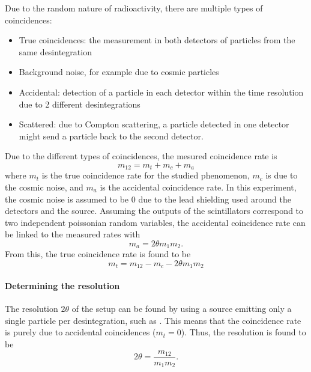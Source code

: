 Due to the random nature of radioactivity, there are multiple types of coincidences:
\begin{itemize}
    \item True coincidences: the measurement in both detectors of particles from the same desintegration
    \item Background noise, for example due to cosmic particles
    \item Accidental: detection of a particle in each detector within the time resolution due to 2 different desintegrations
    \item Scattered: due to Compton scattering, a particle detected in one detector might send a particle back to the second detector.
\end{itemize}

Due to the different types of coincidences, the mesured coincidence rate is
\begin{equation}
    m_{12} = m_t + m_c + m_a
\end{equation}
where \(m_t\) is the true coincidence rate for the studied phenomenon, \(m_c\) is due to the cosmic noise, and \(m_a\) is the accidental coincidence rate. In this experiment, the cosmic noise is assumed to be \(0\) due to the lead shielding used around the detectors and the source. Assuming the outputs of the scintillators correspond to two independent poissonian random variables, the accidental coincidence rate can be linked to the measured rates with
\begin{equation}
    m_a = 2\theta m_1 m_2.
\end{equation}
From this, the true coincidence rate is found to be
\begin{equation}
    m_t = m_{12} - m_c - 2\theta m_1 m_2
\end{equation}

\paragraph{Determining the resolution}
The resolution \(2 \theta\) of the setup can be found by using a source emitting only a single particle per desintegration, such as \cesium. This means that the coincidence rate is purely due to accidental coincidences (\(m_t = 0\)). Thus, the resolution is found to be
\begin{equation}
    2\theta = \frac{m_{12}}{m_1 m_2}.
\end{equation}

